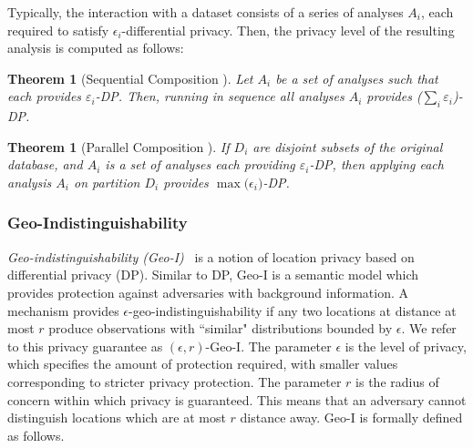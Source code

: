 \documentclass{USC-Thesis}
\numberwithin{equation}{chapter}
\begin{document}
Typically, the interaction with a dataset consists of a series of analyses $A_i$, each required to satisfy $\epsilon_i$-differential privacy. Then, the privacy level of the resulting analysis is computed as follows:
\newtheorem{sequential_composition}[theorem]{Theorem}\label{sequential_composition}
\begin{sequential_composition} [Sequential Composition \cite{mcsherry2009differentially}]
Let $A_i$ be a set of analyses such that each provides $\varepsilon_i$-DP. Then, running in sequence all analyses $A_i$ provides ($\sum_{i}\varepsilon_i$)-DP.
\end{sequential_composition}
\newtheorem{parallel_composition}[theorem]{Theorem}\label{parallel_composition}
\begin{parallel_composition} [Parallel Composition \cite{mcsherry2009differentially}]
If $D_i$ are disjoint subsets of the original database, and $A_i$ is a set of analyses each providing $\varepsilon_i$-DP, then applying each analysis $A_i$ on partition $D_i$ provides $\max{(\epsilon_i})$-DP.
\end{parallel_composition}

\subsubsection{Geo-Indistinguishability}\label{sec:geo-i}
{\em Geo-indistinguishability (Geo-I)}~\cite{andres2013geo} is a notion of location privacy based on differential privacy (DP). Similar to DP, Geo-I is a semantic model which provides protection against adversaries with background information.
A mechanism provides $\epsilon$-geo-indistinguishability if any two locations at distance at most $r$ produce observations with ``similar" distributions bounded by $\epsilon$. We refer to this privacy guarantee as $(\epsilon,r)$-Geo-I. The parameter $\epsilon$ is the level of privacy, which specifies the amount of protection required, with smaller values corresponding to stricter privacy protection. The parameter $r$ is the radius of concern within which privacy is guaranteed. This means that an adversary cannot distinguish locations which are at most $r$ distance away. Geo-I is formally defined as follows.

\end{document}
